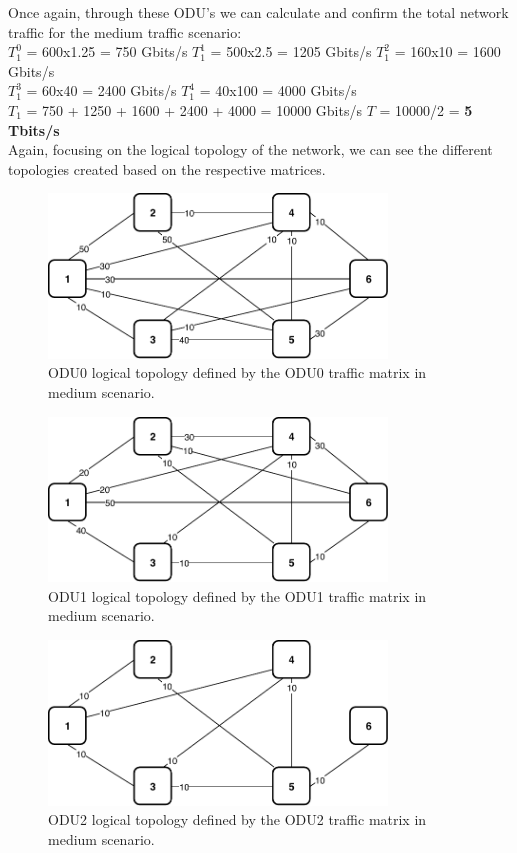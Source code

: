 Once again, through these ODU's we can calculate and confirm the total network traffic for the medium traffic scenario:\\

$T_1^0$ = 600x1.25 = 750 Gbits/s \quad
$T_1^1$ = 500x2.5 = 1205 Gbits/s \quad
$T_1^2$ = 160x10 = 1600 Gbits/s \\

$T_1^3$ = 60x40 = 2400 Gbits/s \quad
$T_1^4$ = 40x100 = 4000 Gbits/s \\

$T_{1}$ = 750 + 1250 + 1600 + 2400 + 4000 = 10000 Gbits/s \qquad
$T$ = 10000/2 = \textbf{5 Tbits/s}\\

Again, focusing on the logical topology of the network, we can see the different topologies created based on the respective matrices.
\newpage
\begin{figure}[h!]
\centering
\includegraphics[width=9cm]{sdf/ilp/opaque_survivability/figures/logical_topology_ODU0_medium}
\caption{ODU0 logical topology defined by the ODU0 traffic matrix in medium scenario.}
\label{logical_ODU0_medium}
\end{figure}

\begin{figure}[h!]
\centering
\includegraphics[width=9cm]{sdf/ilp/opaque_survivability/figures/logical_topology_ODU1_medium}
\caption{ODU1 logical topology defined by the ODU1 traffic matrix in medium scenario.}
\label{logical_ODU1_medium}
\end{figure}

\begin{figure}[h!]
\centering
\includegraphics[width=9cm]{sdf/ilp/opaque_survivability/figures/logical_topology_ODU2_medium}
\caption{ODU2 logical topology defined by the ODU2 traffic matrix in medium scenario.}
\label{logical_ODU2_medium}
\end{figure}

